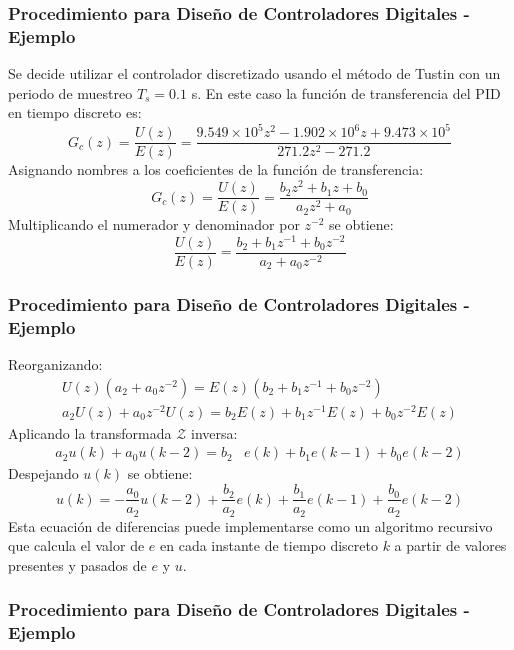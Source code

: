 \documentclass[aspectratio=169]{beamer}
\theoremstyle{definition}
\theoremstyle{plain}
\theoremstyle{remark}
\begin{document}
\begin{frame}[c]\frametitle{Procedimiento para Diseño de Controladores Digitales - Ejemplo}
	Se decide utilizar el controlador discretizado usando el método de Tustin con un periodo de muestreo $T_s = 0.1$ s.
	\pause
	En este caso la función de transferencia del PID en tiempo discreto es:
	\begin{equation*}
		G_c(z) = \frac{U(z)}{E(z)} = \frac{9.549 \times 10^{5} z^2 - 1.902 \times  10^{6} z + 9.473 \times 10^{5}}{271.2 z^2 - 271.2}
	\end{equation*}
	\pause
	Asignando nombres a los coeficientes de la función de transferencia:
	\begin{equation*}
		G_c(z) = \frac{U(z)}{E(z)} = \frac{b_2 z^2 + b_1 z + b_0}{a_2 z^2 + a_0}
	\end{equation*}
	\pause
	Multiplicando el numerador y denominador por $z^{-2}$ se obtiene:
	\begin{equation*}
		\frac{U(z)}{E(z)} = \frac{b_2 + b_1 z^{-1} + b_0 z^{-2}}{a_2 + a_0 z^{-2}}
	\end{equation*}
\end{frame}

\begin{frame}[c]\frametitle{Procedimiento para Diseño de Controladores Digitales - Ejemplo}
	Reorganizando:
	\begin{align*}
		U(z)\left(a_2 + a_0 z^{-2}\right) = E(z)\left( b_2 + b_1 z^{-1} + b_0 z^{-2} \right)\\
		a_2 U(z) + a_0 z^{-2}U(z) = b_2 E(z) + b_1 z^{-1}E(z) + b_0 z^{-2}E(z)
	\end{align*}
	\pause
	Aplicando la transformada $\mathcal{Z}$ inversa:
	\begin{align*}
		a_2 u(k) + a_0 u(k-2) = b_2&e(k) + b_1 e(k-1) + b_0 e(k-2)
	\end{align*}
	\pause
	Despejando $u(k)$ se obtiene:
	\begin{equation*}
		u(k) = -\frac{a_0}{a_2}u(k-2) + \frac{b_2}{a_2} e(k) + \frac{b_1}{a_2} e(k-1) + \frac{b_0}{a_2} e(k-2)
	\end{equation*}
	\pause
	Esta ecuación de diferencias puede implementarse como un algoritmo recursivo que calcula el valor de $e$ en cada instante de tiempo discreto $k$ a partir de valores presentes y pasados de $e$ y $u$.
\end{frame}

\begin{frame}[c]\frametitle{Procedimiento para Diseño de Controladores Digitales - Ejemplo}
	
\end{frame}
\end{document}
